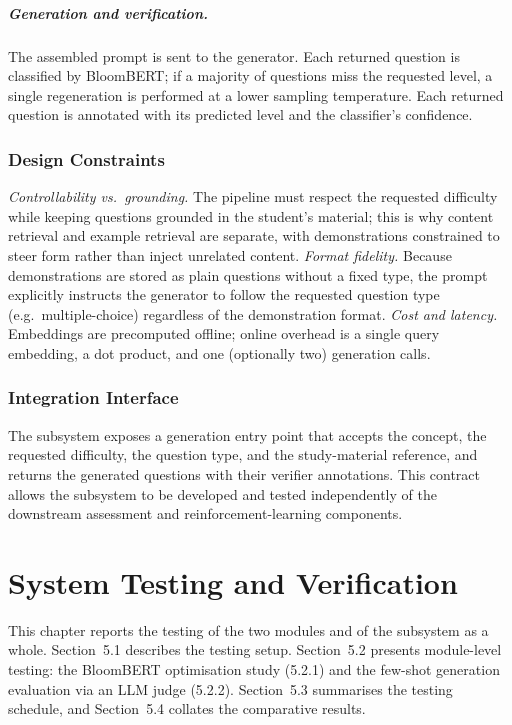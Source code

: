 \documentclass[12pt,a4paper]{report}
\begin{document}
\paragraph{Generation and verification.}
The assembled prompt is sent to the generator. Each returned question is
classified by BloomBERT; if a majority of questions miss the requested level, a
single regeneration is performed at a lower sampling temperature. Each returned
question is annotated with its predicted level and the classifier's confidence.

\subsection{Design Constraints}
\emph{Controllability vs.\ grounding.} The pipeline must respect the requested
difficulty while keeping questions grounded in the student's material; this is
why content retrieval and example retrieval are separate, with demonstrations
constrained to steer form rather than inject unrelated content. \emph{Format
fidelity.} Because demonstrations are stored as plain questions without a fixed
type, the prompt explicitly instructs the generator to follow the requested
question type (e.g.\ multiple-choice) regardless of the demonstration format.
\emph{Cost and latency.} Embeddings are precomputed offline; online overhead is a
single query embedding, a dot product, and one (optionally two) generation calls.

\subsection{Integration Interface}
The subsystem exposes a generation entry point that accepts the concept, the
requested difficulty, the question type, and the study-material reference, and
returns the generated questions with their verifier annotations. This contract
allows the subsystem to be developed and tested independently of the downstream
assessment and reinforcement-learning components.

\chapter{System Testing and Verification}

This chapter reports the testing of the two modules and of the subsystem as a
whole. Section~5.1 describes the testing setup. Section~5.2 presents module-level
testing: the BloomBERT optimisation study (5.2.1) and the few-shot generation
evaluation via an LLM judge (5.2.2). Section~5.3 summarises the testing schedule,
and Section~5.4 collates the comparative results.
\end{document}
